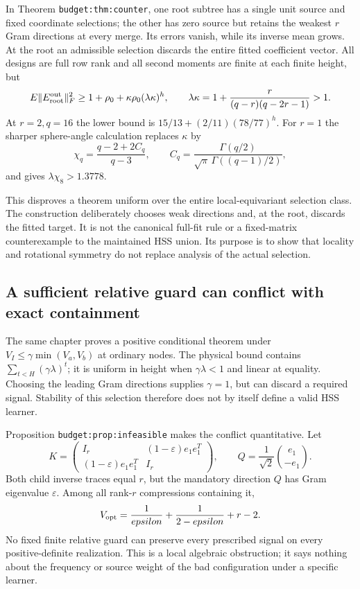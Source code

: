 \documentclass[11pt,oneside,openany,a4paper]{report}
\numberwithin{equation}{chapter}
\theoremstyle{definition}
\theoremstyle{remark}
\begin{document}
In Theorem \texttt{budget:thm:counter}, one root subtree has a
single unit source and fixed coordinate selections; the other
has zero source but retains the weakest $r$ Gram directions at
every merge.  Its errors vanish, while its inverse mean grows.
At the root an admissible selection discards the entire fitted
coefficient vector.  All designs are full row rank and all
second moments are finite at each finite height, but
\[
 \mathbb E\|E_{\rm root}^{\rm out}\|_F^2
 \ge1+\rho_0+\kappa\rho_0(\lambda\kappa)^h,\qquad
 \lambda\kappa
 =1+\frac{r}{(q-r)(q-2r-1)}>1.
\]
At $r=2,q=16$ the lower bound is
$15/13+(2/11)(78/77)^h$.
For $r=1$ the sharper sphere-angle calculation replaces $\kappa$
by
\[
 \chi_q=\frac{q-2+2C_q}{q-3},\qquad
 C_q=\frac{\Gamma(q/2)}
            {\sqrt\pi\,\Gamma((q-1)/2)},
\]
and gives $\lambda\chi_8>1.3778$.

This disproves a theorem uniform over the entire local-equivariant
selection class.  The construction deliberately chooses weak
directions and, at the root, discards the fitted target.  It is
not the canonical full-fit rule or a fixed-matrix counterexample
to the maintained HSS union.  Its purpose is to show that locality
and rotational symmetry do not replace analysis of the actual
selection.

\subsection{A sufficient relative guard can conflict with exact containment}

The same chapter proves a positive conditional theorem under
$V_I\le\gamma\min(V_a,V_b)$ at ordinary nodes.  The physical
bound contains $\sum_{t<H}(\gamma\lambda)^t$; it is uniform in
height when $\gamma\lambda<1$ and linear at equality.  Choosing
the leading Gram directions supplies $\gamma=1$, but can discard
a required signal.  Stability of this selection therefore does
not by itself define a valid HSS learner.

Proposition \texttt{budget:prop:infeasible} makes the conflict
quantitative.  Let
\[
 K=\begin{pmatrix}
 I_r&(1-\varepsilon)e_1e_1^T\\
 (1-\varepsilon)e_1e_1^T&I_r
 \end{pmatrix},\qquad
 Q=\frac1{\sqrt2}\binom{e_1}{-e_1}.
\]
Both child inverse traces equal $r$, but the mandatory direction
$Q$ has Gram eigenvalue $\varepsilon$.  Among all rank-$r$
compressions containing it,
\[
 V_{\rm opt}=\frac1\varepsilon+\frac1{2-\varepsilon}+r-2.
\]
No fixed finite relative guard can preserve every prescribed
signal on every positive-definite realization.  This is a local
algebraic obstruction; it says nothing about the frequency or
source weight of the bad configuration under a specific learner.
\end{document}
